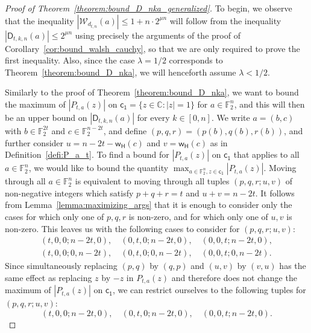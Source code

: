 \documentclass[runningheads,orivec]{llncs}
\newcommand{\C}{\mathbb{C}}
\newcommand{\dis}{\mathsf{c_1}}
\newcommand{\Dtkna}[4]{\mathsf{D}_{#1,#2,#3}(#4)}
\newcommand{\F}{\mathbb{F}}
\newcommand{\w}{\mathsf{w_H}}
\newcommand{\wt}[1]{\mathcal W_{#1}}
\let\leq=\leqslant
\begin{document}
    \begin{proof}[Proof of Theorem~\ref{theorem:bound_D_nka_generalized}]
        To begin, we observe that the inequality $|\wt{d_{t,n}}(a)|\leq 1+n\cdot 2^{\mu n}$ will follow from the inequality $|\Dtkna tkna|\leq 2^{\mu n}$ using precisely the arguments of the proof of Corollary~\ref{cor:bound_walsh_cauchy}, so that we are only required to prove the first inequality. Also, since the case $\lambda=1/2$ corresponds to Theorem~\ref{theorem:bound_D_nka}, we will henceforth assume $\lambda<1/2$.
        
        Similarly to the proof of Theorem~\ref{theorem:bound_D_nka}, we want to bound the maximum of $|P_{t,a}(z)|$ on $\dis=\{ z \in \C: |z|=1  \}$ for $a\in\F_2^n$, and this will then be an upper bound on $|\Dtkna tkna|$ for every $k\in[0,n]$. We write $a=(b,c)$ with $b\in\F_2^{2t}$ and $c\in\F_2^{n-2t}$, and define $(p,q,r)=(p(b),q(b),r(b))$, and further consider $u=n-2t-\w(c)$ and $v=\w(c)$ as in Definition~\ref{defi:P_a_t}. To find a bound for $|P_{t,a}(z)|$ on $\dis$ that applies to all $a\in\F_2^n$, we would like to bound the quantity $\max_{a\in\F_2^n,z\in\dis}|P_{t,a}(z)|$. Moving through all $a\in\F_2^n$ is equivalent to moving through all tuples $(p,q,r;u,v)$ of non-negative integers which satisfy $p+q+r=t$ and $u+v=n-2t$. It follows from Lemma~\ref{lemma:maximizing_args} that it is enough to consider only the cases for which only one of $p,q,r$ is non-zero, and for which only one of $u,v$ is non-zero. This leaves us with the following cases to consider for $(p,q,r;u,v)$:
        \begin{gather*}
            (t,0,0;n-2t,0),\quad(0,t,0;n-2t,0),\quad(0,0,t;n-2t,0),\\
            (t,0,0;0,n-2t),\quad(0,t,0;0,n-2t),\quad(0,0,t;0,n-2t).
        \end{gather*}
        Since simultaneously replacing $(p,q)$ by $(q,p)$ and $(u,v)$ by $(v,u)$ has the same effect as replacing $z$ by $-z$ in $P_{t,a}(z)$ and therefore does not change the maximum of $|P_{t,a}(z)|$ on $\dis$, we can restrict ourselves to the following tuples for $(p,q,r;u,v)$:
        \[
            (t,0,0;n-2t,0),\quad(0,t,0;n-2t,0),\quad(0,0,t;n-2t,0).
        \]
    

\end{proof}
\end{document}
